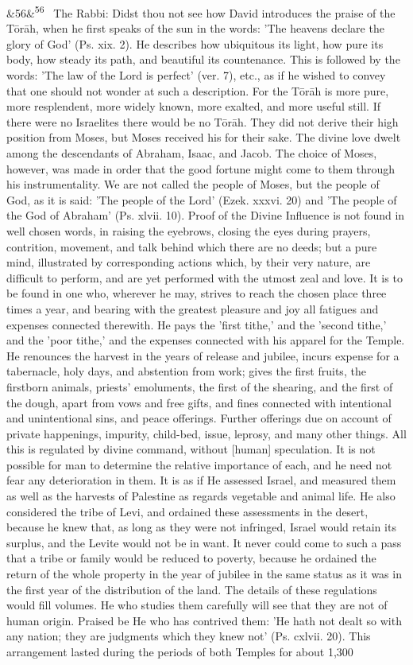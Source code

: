 \documentclass[12pt]{article}
\newcommand{\para}[1][]{\par\noindent\ifx&#1&\else\textsuperscript{\footnotesize #1}~\fi}
\begin{document}
\para[56] The Rabbi: Didst thou not see how David introduces the praise of the Tōrāh, when he first speaks of the sun in the words: 'The heavens declare the glory of God' (Ps. xix. 2). He describes how ubiquitous its light, how pure its body, how steady its path, and beautiful its countenance. This is followed by the words: 'The law of the Lord is perfect' (ver. 7), etc., as if he wished to convey that one should not wonder at such a description. For the Tōrāh is more pure, more resplendent, more widely known, more exalted, and more useful still. If there were no Israelites there would be no Tōrāh. They did not derive their high position from Moses, but Moses received his for their sake. The divine love dwelt among the descendants of Abraham, Isaac, and Jacob. The choice of Moses, however, was made in order that the good fortune might come to them through his instrumentality. We are not called the people of Moses, but the people of God, as it is said: 'The people of the Lord' (Ezek. xxxvi. 20) and 'The people of the God of Abraham' (Ps. xlvii. 10). Proof of the Divine Influence is not found in well chosen words, in raising the eyebrows, closing the eyes during prayers, contrition, movement, and talk behind which there are no deeds; but a pure mind, illustrated by corresponding actions which, by their very nature, are difficult to perform, and are yet performed with the utmost zeal and love. It is to be found in one who, wherever he may, strives to reach the chosen place three times a year, and bearing with the greatest pleasure and joy all fatigues and expenses connected therewith. He pays the 'first tithe,' and the 'second tithe,' and the 'poor tithe,' and the expenses connected with his apparel for the Temple. He renounces the harvest in the years of release and jubilee, incurs expense for a tabernacle, holy days, and abstention from work; gives the first fruits, the firstborn animals, priests' emoluments, the first of the shearing, and the first of the dough, apart from vows and free gifts, and fines connected with intentional and unintentional sins, and peace offerings. Further offerings due on account of private happenings, impurity, child-bed, issue, leprosy, and many other things. All this is regulated by divine command, without [human] speculation. It is not possible for man to determine the relative importance of each, and he need not fear any deterioration in them. It is as if He assessed Israel, and measured them as well as the harvests of Palestine as regards vegetable and animal life. He also considered the tribe of Levi, and ordained these assessments in the desert, because he knew that, as long as they were not infringed, Israel would retain its surplus, and the Levite would not be in want. It never could come to such a pass that a tribe or family would be reduced to poverty, because he ordained the return of the whole property in the year of jubilee in the same status as it was in the first year of the distribution of the land. The details of these regulations would fill volumes. He who studies them carefully will see that they are not of human origin. Praised be He who has contrived them: 'He hath not dealt so with any nation; they are judgments which they knew not' (Ps. cxlvii. 20). This arrangement lasted during the periods of both Temples for about 1,300 
\end{document}
